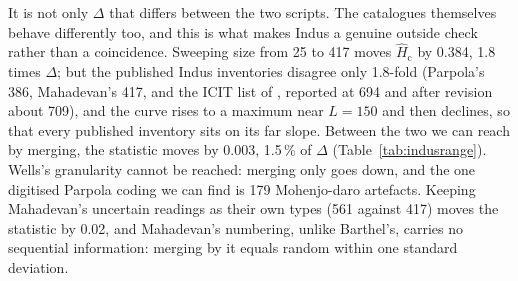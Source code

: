\documentclass[11pt,a4paper]{article}
\newcommand{\Hcn}{\hat H_{\mathrm{c}}}
\begin{document}
\begin{enumerate}
It is not only $\Delta$ that differs between the two scripts. The catalogues themselves behave differently too, and this is what makes Indus a genuine outside check rather than a coincidence. Sweeping size from 25 to 417 moves $\Hcn$ by 0.384, 1.8 times $\Delta$; but the published Indus inventories disagree only 1.8-fold (Parpola's 386, Mahadevan's 417, and the ICIT list of \citet{wells2015}, reported at 694 and after revision about 709), and the curve rises to a maximum near $L=150$ and then declines, so that every published inventory sits on its far slope. Between the two we can reach by merging, the statistic moves by 0.003, 1.5\,\% of $\Delta$ (Table~\ref{tab:indusrange}). Wells's granularity cannot be reached: merging only goes down, and the one digitised Parpola coding we can find is 179 Mohenjo-daro artefacts. Keeping Mahadevan's uncertain readings as their own types (561 against 417) moves the statistic by 0.02, and Mahadevan's numbering, unlike Barthel's, carries no sequential information: merging by it equals random within one standard deviation.


\end{enumerate}
\end{document}

